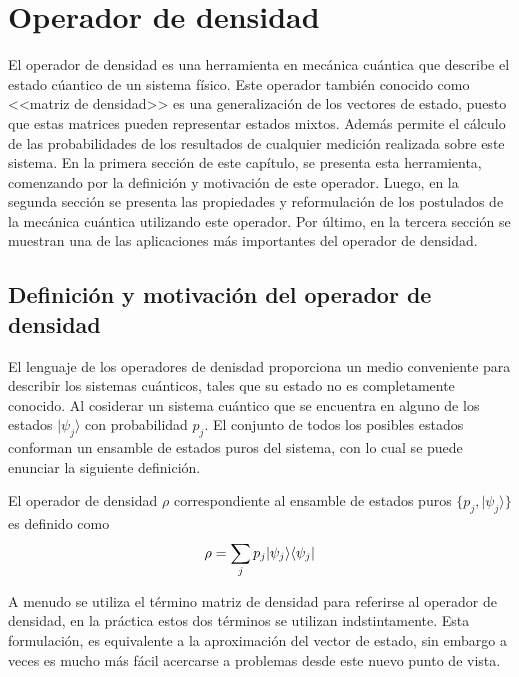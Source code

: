 \chapter{Operador de densidad}\label{OpDensidad}

El operador de densidad es una herramienta en mecánica cuántica que describe el estado cúantico de un sistema físico. Este operador también conocido como <<matriz de densidad>> es una generalización de los vectores de estado, puesto que estas matrices pueden representar estados mixtos. Además permite el cálculo de las probabilidades de los resultados de cualquier medición realizada sobre este sistema.  En la primera sección de este capítulo, se presenta esta herramienta, comenzando por la definición y motivación de este operador. Luego, en la segunda sección  se presenta las propiedades y reformulación de los postulados de la mecánica cuántica utilizando este operador. Por último, en la tercera sección se muestran una de las aplicaciones más importantes del operador de densidad. 



\section{Definición y motivación  del operador de densidad}
El lenguaje de los operadores de denisdad proporciona un  medio conveniente para describir los sistemas cuánticos, tales que su estado no es completamente conocido. Al cosiderar un sistema cuántico que se encuentra en alguno de los estados $|\psi_j \rangle $ con probabilidad $p_j$. El conjunto de todos los posibles estados conforman un ensamble
de estados puros del sistema, con lo cual se puede enunciar la siguiente definición. 

  \begin{definition} El operador de densidad $\rho$ correspondiente al ensamble de estados puros $\{p_j,|\psi_j \rangle \}$ es definido como {\cite{wilde2011classical}}
  	\begin{equation}{\label{defdensityoperator}}
  		\rho=\sum_{j}p_j|\psi_j\rangle \langle \psi_j|
  	\end{equation}
  
  	\end{definition}
  	

 A menudo se utiliza el término matriz de densidad para referirse al operador de densidad, en la práctica estos dos términos se utilizan indstintamente. Esta formulación, es equivalente a la aproximación del vector de estado, sin embargo a veces es mucho más fácil acercarse a problemas desde este nuevo punto de vista.
 
